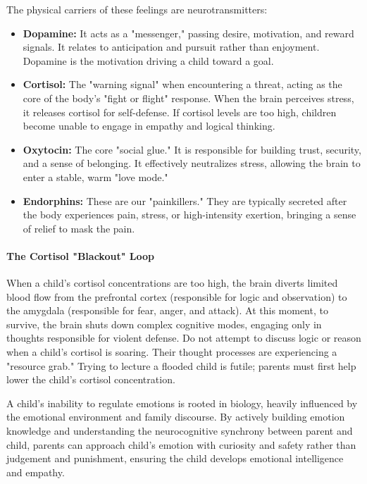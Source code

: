The physical carriers of these feelings are neurotransmitters:
\begin{itemize}
    \item \textbf{Dopamine:} It acts as a "messenger," passing desire, motivation, and reward signals. 
    It relates to anticipation and pursuit rather than enjoyment. 
    Dopamine is the motivation driving a child toward a goal.
    \item \textbf{Cortisol:} The "warning signal" when encountering a threat, acting as the core of the body's "fight or flight" response. 
    When the brain perceives stress, it releases cortisol for self-defense. 
    If cortisol levels are too high, children become unable to engage in empathy and logical thinking.
    \item \textbf{Oxytocin:} The core "social glue." 
    It is responsible for building trust, security, and a sense of belonging. 
    It effectively neutralizes stress, allowing the brain to enter a stable, warm "love mode."
    \item \textbf{Endorphins:} These are our "painkillers." 
    They are typically secreted after the body experiences pain, stress, or high-intensity exertion, bringing a sense of relief to mask the pain.
\end{itemize}

\paragraph{The Cortisol "Blackout" Loop}
When a child's cortisol concentrations are too high, the brain diverts limited blood flow from the prefrontal cortex (responsible for logic and observation) to the amygdala (responsible for fear, anger, and attack). 
At this moment, to survive, the brain shuts down complex cognitive modes, engaging only in thoughts responsible for violent defense. 
Do not attempt to discuss logic or reason when a child's cortisol is soaring. 
Their thought processes are experiencing a "resource grab." 
Trying to lecture a flooded child is futile; parents must first help lower the child's cortisol concentration.

\begin{keyinsight}
A child's inability to regulate emotions is rooted in biology, heavily influenced by the emotional environment and family discourse. 
By actively building emotion knowledge and understanding the neurocognitive synchrony between parent and child, parents can approach child's emotion with curiosity and safety rather than judgement and punishment, ensuring the child develops emotional intelligence and empathy.
\end{keyinsight}

